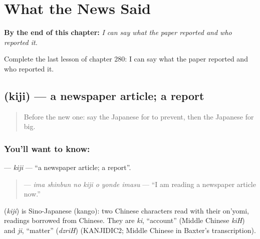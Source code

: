 
\chapter{What the News Said}
\label{ch:ja-what-the-news-said}

\begin{chapteropening}
\textbf{By the end of this chapter:} \emph{I can say what the paper reported and who reported it.}

Complete the last lesson of chapter 280: I can say what the paper reported and who reported it.
\end{chapteropening}

\section[\texorpdfstring{\ja{きじ} (kiji)}{きじ (kiji)}]{ (kiji) — a newspaper article; a report}

\label{lesson:JA-C280-kiji}



\begin{quote}
Before the new one: say the Japanese for to prevent, then the Japanese for big.
\end{quote}

\subsection*{You'll want to know: }
\textbf{} — \emph{kiji} — \textquotedblleft{}a newspaper article; a report\textquotedblright{}.

\begin{quote}
\textbf{   } — \emph{ima shinbun no kiji o yonde imasu} — \textquotedblleft{}I am reading a newspaper article now.\textquotedblright{}
\end{quote}

\begin{cousinweb}
\textbf{} (\emph{kiji}) is Sino-Japanese (kango): two Chinese characters read with their on'yomi, readings borrowed from Chinese. They are \emph{ki}, \textquotedblleft{}account\textquotedblright{} (Middle Chinese \emph{kiH}) and \emph{ji}, \textquotedblleft{}matter\textquotedblright{} (\emph{dzriH}) (KANJIDIC2; Middle Chinese in Baxter's transcription).
\end{cousinweb}

